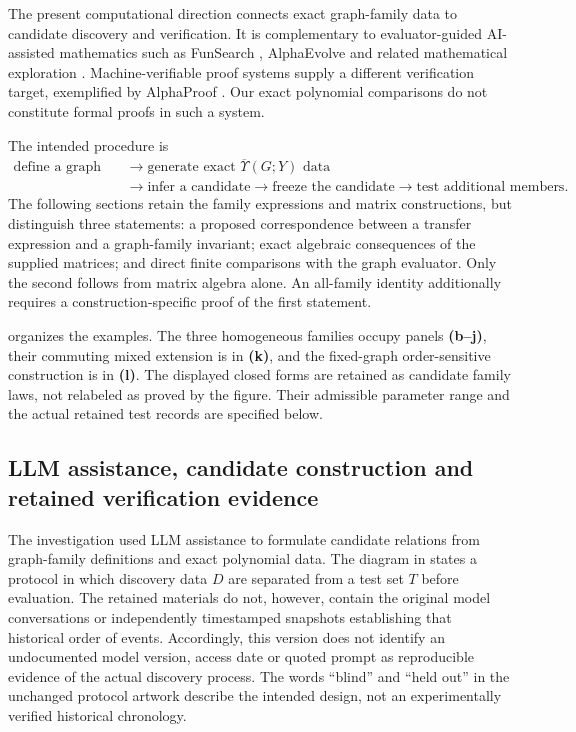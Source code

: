 The present computational direction connects exact graph-family data to candidate discovery and verification. It is complementary to evaluator-guided AI-assisted mathematics such as FunSearch \cite{kg_funsearch2024}, AlphaEvolve \cite{kg_alphaevolve2025} and related mathematical exploration \cite{kg_georgiev2025mathematical}. Machine-verifiable proof systems supply a different verification target, exemplified by AlphaProof \cite{kg_alphaproof2026}. Our exact polynomial comparisons do not constitute formal proofs in such a system.

The intended procedure is
\begin{equation}
\boxed{\begin{aligned}
\text{define a graph family}&\longrightarrow\text{generate exact }\overline{\Upsilon}(G;Y)\text{ data}\\
&\longrightarrow\text{infer a candidate}\longrightarrow\text{freeze the candidate}\longrightarrow\text{test additional members}.
\end{aligned}}
\label{suppeq:yamada_discovery_direction}
\end{equation}
The following sections retain the family expressions and matrix constructions, but distinguish three statements: a proposed correspondence between a transfer expression and a graph-family invariant; exact algebraic consequences of the supplied matrices; and direct finite comparisons with the graph evaluator. Only the second follows from matrix algebra alone. An all-family identity additionally requires a construction-specific proof of the first statement.

 organizes the examples. The three homogeneous families occupy panels \textbf{(b--j)}, their commuting mixed extension is in \textbf{(k)}, and the fixed-graph order-sensitive construction is in \textbf{(l)}. The displayed closed forms are retained as candidate family laws, not relabeled as proved by the figure. Their admissible parameter range and the actual retained test records are specified below.

\subsection{LLM assistance, candidate construction and retained verification evidence}
\label{supp:llm_discovery_protocol}
The investigation used LLM assistance to formulate candidate relations from graph-family definitions and exact polynomial data. The diagram in  states a protocol in which discovery data $D$ are separated from a test set $T$ before evaluation. The retained materials do not, however, contain the original model conversations or independently timestamped snapshots establishing that historical order of events. Accordingly, this version does not identify an undocumented model version, access date or quoted prompt as reproducible evidence of the actual discovery process. The words ``blind'' and ``held out'' in the unchanged protocol artwork describe the intended design, not an experimentally verified historical chronology.

